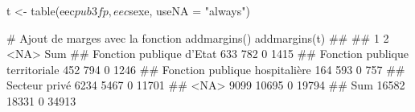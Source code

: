 \documentclass[12pt,twosided, notitlepage]{book}
\newenvironment{Shaded}{}{}
\newcommand{\CommentTok}[1]{\textcolor[rgb]{0.00,0.50,0.00}{#1}}
\newcommand{\DataTypeTok}[1]{#1}
\newcommand{\KeywordTok}[1]{\textcolor[rgb]{0.00,0.00,1.00}{#1}}
\newcommand{\NormalTok}[1]{#1}
\newcommand{\OperatorTok}[1]{#1}
\newcommand{\StringTok}[1]{\textcolor[rgb]{0.00,0.50,0.50}{#1}}
\renewenvironment{Shaded}{\begin{snugshade}}{\end{snugshade}}
\begin{document}
\begin{Shaded}
\begin{Highlighting}[]
\NormalTok{t <-}\StringTok{ }\KeywordTok{table}\NormalTok{(eec}\OperatorTok{$}\NormalTok{pub3fp, eec}\OperatorTok{$}\NormalTok{sexe, }\DataTypeTok{useNA =} \StringTok{"always"}\NormalTok{)}

\CommentTok{# Ajout de marges avec la fonction addmargins()}
\KeywordTok{addmargins}\NormalTok{(t)}
\NormalTok{  ##                                 }
\NormalTok{  ##                                      1     2  <NA>   Sum}
\NormalTok{  ##   Fonction publique d'Etat         633   782     0  1415}
\NormalTok{  ##   Fonction publique territoriale   452   794     0  1246}
\NormalTok{  ##   Fonction publique hospitalière   164   593     0   757}
\NormalTok{  ##   Secteur privé                   6234  5467     0 11701}
\NormalTok{  ##   <NA>                            9099 10695     0 19794}
\NormalTok{  ##   Sum                            16582 18331     0 34913}


\end{Highlighting}
\end{Shaded}
\end{document}
